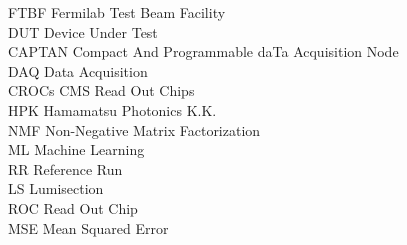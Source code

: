\begin{tabbing}
	FTBF \> Fermilab Test Beam Facility\\
	DUT \> Device Under Test\\
	CAPTAN \> Compact And Programmable daTa Acquisition Node\\
	DAQ \> Data Acquisition\\
	CROCs \> CMS Read Out Chips\\
	HPK \> Hamamatsu Photonics K.K.\\
	NMF \> Non-Negative Matrix Factorization\\
	ML \> Machine Learning\\
        RR \> Reference Run\\
	LS \> Lumisection\\
	ROC \> Read Out Chip\\
        MSE \> Mean Squared Error\\


\end{tabbing}

